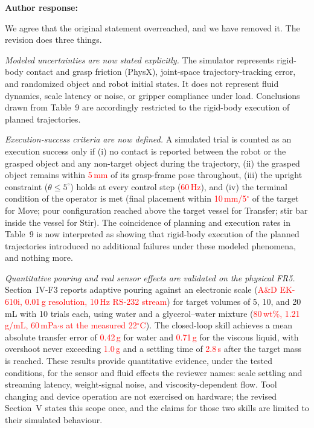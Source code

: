 \documentclass[11pt]{article}
\newcommand{\nd}[1]{\textcolor{red}{#1}}
\newenvironment{response}{\textbf{Author response:}\par\smallskip}{\par\medskip}
\begin{document}
\begin{response}
We agree that the original statement overreached, and we have removed it.
The revision does three things.

\emph{Modeled uncertainties are now stated explicitly.}
The simulator represents rigid-body contact and grasp friction (PhysX), joint-space trajectory-tracking error, and randomized object and robot initial states.
It does not represent fluid dynamics, scale latency or noise, or gripper compliance under load.
Conclusions drawn from Table~9 are accordingly restricted to the rigid-body execution of planned trajectories.

\emph{Execution-success criteria are now defined.}
A simulated trial is counted as an execution success only if (i) no contact is reported between the robot or the grasped object and any non-target object during the trajectory, (ii) the grasped object remains within \nd{5\,mm} of its grasp-frame pose throughout, (iii) the upright constraint ($\theta \le 5^\circ$) holds at every control step (\nd{60\,Hz}), and (iv) the terminal condition of the operator is met (final placement within \nd{10\,mm/5$^\circ$} of the target for Move; pour configuration reached above the target vessel for Transfer; stir bar inside the vessel for Stir).
The coincidence of planning and execution rates in Table~9 is now interpreted as showing that rigid-body execution of the planned trajectories introduced no additional failures under these modeled phenomena, and nothing more.

\emph{Quantitative pouring and real sensor effects are validated on the physical FR5.}
Section~IV-F3 reports adaptive pouring against an electronic scale (\nd{A\&D EK-610i, 0.01\,g resolution, 10\,Hz RS-232 stream}) for target volumes of 5, 10, and 20\,mL with 10 trials each, using water and a glycerol--water mixture (\nd{80\,wt\%, 1.21\,g/mL, 60\,mPa$\cdot$s at the measured 22$^\circ$C}).
The closed-loop skill achieves a mean absolute transfer error of \nd{0.42\,g} for water and \nd{0.71\,g} for the viscous liquid, with overshoot never exceeding \nd{1.0\,g} and a settling time of \nd{2.8\,s} after the target mass is reached.
These results provide quantitative evidence, under the tested conditions, for the sensor and fluid effects the reviewer names: scale settling and streaming latency, weight-signal noise, and viscosity-dependent flow.
Tool changing and device operation are not exercised on hardware; the revised Section~V states this scope once, and the claims for those two skills are limited to their simulated behaviour.
\end{response}
\end{document}
